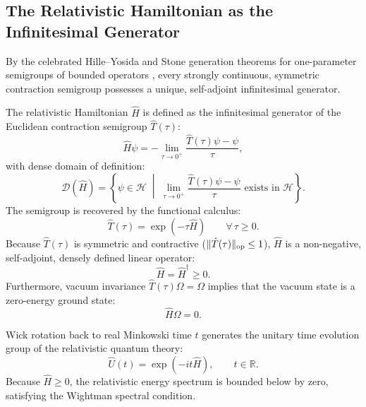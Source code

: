 \subsection{The Relativistic Hamiltonian as the Infinitesimal Generator}
\label{subsec:hamiltonian_generator_gns}

By the celebrated Hille--Yosida and Stone generation theorems for one-parameter semigroups of bounded operators \cite{ReedSimon1975, ReedSimon1980}, every strongly continuous, symmetric contraction semigroup possesses a unique, self-adjoint infinitesimal generator.

\begin{definition}
\label{def:relativistic_hamiltonian}
The relativistic Hamiltonian $\hat{H}$ is defined as the infinitesimal generator of the Euclidean contraction semigroup $\hat{T}(\tau)$:
\begin{equation}
\label{eq:hamiltonian_generator_def}
\hat{H} \psi = -\lim_{\tau \to 0^+} \frac{\hat{T}(\tau) \psi - \psi}{\tau},
\end{equation}
with dense domain of definition:
\begin{equation}
\label{eq:hamiltonian_domain}
\mathcal{D}(\hat{H}) = \left\{ \psi \in \mathcal{H} \;\middle|\; \lim_{\tau \to 0^+} \frac{\hat{T}(\tau) \psi - \psi}{\tau} \text{ exists in } \mathcal{H} \right\}.
\end{equation}
The semigroup is recovered by the functional calculus:
\begin{equation}
\hat{T}(\tau) = \exp(-\tau \hat{H}) \qquad \forall \, \tau \ge 0.
\end{equation}
Because $\hat{T}(\tau)$ is symmetric and contractive ($\|\hat{T}(\tau)\|_{\mathrm{op}} \le 1$), $\hat{H}$ is a non-negative, self-adjoint, densely defined linear operator:
\begin{equation}
\hat{H} = \hat{H}^\dagger \ge 0.
\end{equation}
Furthermore, vacuum invariance $\hat{T}(\tau) \Omega = \Omega$ implies that the vacuum state is a zero-energy ground state:
\begin{equation}
\label{eq:vacuum_zero_energy}
\hat{H} \Omega = 0.
\end{equation}
\end{definition}

Wick rotation back to real Minkowski time $t$ generates the unitary time evolution group of the relativistic quantum theory:
\begin{equation}
\hat{U}(t) = \exp(-i t \hat{H}), \qquad t \in \mathbb{R}.
\end{equation}
Because $\hat{H} \ge 0$, the relativistic energy spectrum is bounded below by zero, satisfying the Wightman spectral condition.

